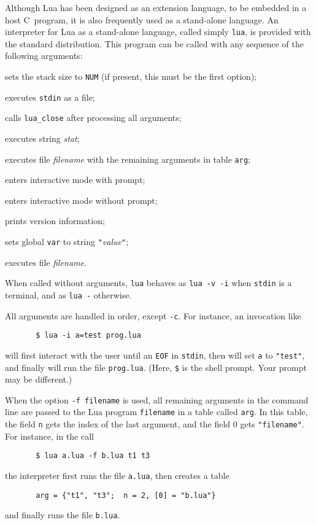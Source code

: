 \documentclass[11pt,twoside,draft]{article}
\newcommand{\T}[1]{{\tt #1}}
\begin{document}
Although Lua has been designed as an extension language,
to be embedded in a host C~program,
it is also frequently used as a stand-alone language.
An interpreter for Lua as a stand-alone language,
called simply \verb|lua|,
is provided with the standard distribution.
This program can be called with any sequence of the following arguments:
\begin{description}\leftskip=20pt
\item[\T{-sNUM}] sets the stack size to \T{NUM}
(if present, this must be the first option);
\item[\T{-} ] executes \verb|stdin| as a file;
\item[\T{-c}] calls \verb|lua_close| after processing all arguments;
\item[\T{-e} \rm\emph{stat}] executes string \emph{stat};
\item[\T{-f} \rm\emph{filename}] executes file \emph{filename} with the
remaining arguments in table \verb|arg|;
\item[\T{-i}] enters interactive mode with prompt;
\item[\T{-q}] enters interactive mode without prompt;
\item[\T{-v}] prints version information;
\item[\T{var=}\rm\emph{value}] sets global \verb|var| to string \verb|"|\emph{value}\verb|"|;
\item[\emph{filename}] executes file \emph{filename}.
\end{description}
When called without arguments,
\verb|lua| behaves as \verb|lua -v -i| when \verb|stdin| is a terminal,
and as \verb|lua -| otherwise.

All arguments are handled in order, except \verb|-c|.
For instance, an invocation like
\begin{verbatim}
       $ lua -i a=test prog.lua
\end{verbatim}
will first interact with the user until an \verb|EOF| in \verb|stdin|,
then will set \verb|a| to \verb|"test"|,
and finally will run the file \verb|prog.lua|.
(Here,
\verb|$| is the shell prompt. Your prompt may be different.)

When the option \T{-f filename} is used,
all remaining arguments in the command line
are passed to the Lua program \verb|filename| in a table called \verb|arg|.
In this table,
the field \verb|n| gets the index of the last argument,
and the field 0 gets \verb|"filename"|.
For instance, in the call
\begin{verbatim}
       $ lua a.lua -f b.lua t1 t3
\end{verbatim}
the interpreter first runs the file \T{a.lua},
then creates a table
\begin{verbatim}
       arg = {"t1", "t3";  n = 2, [0] = "b.lua"}
\end{verbatim}
and finally runs the file \T{b.lua}.
\end{document}
